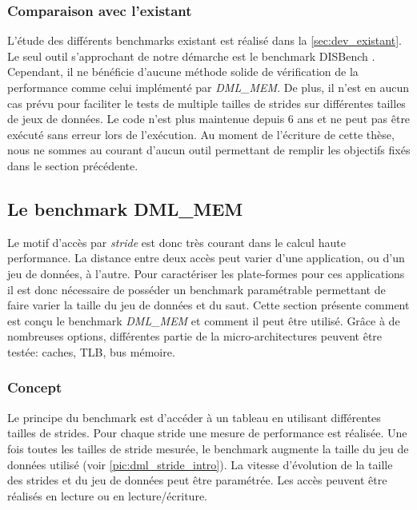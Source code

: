     
    \subsubsection{Comparaison avec l'existant}
        L'étude des différents benchmarks existant est réalisé dans la \autoref{sec:dev_existant}. Le seul outil s'approchant de notre démarche est le benchmark DISBench \cite{disbench}. Cependant, il ne bénéficie d'aucune méthode solide de vérification de la performance comme celui implémenté par \textit{DML\_MEM}. De plus, il n'est en aucun cas prévu pour faciliter le tests de multiple tailles de strides sur différentes tailles de jeux de données. Le code n'est plus maintenue depuis 6 ans et ne peut pas être exécuté sans erreur lors de l'exécution. Au moment de l'écriture de cette thèse, nous ne sommes au courant d'aucun outil permettant de remplir les objectifs fixés dans le section précédente. 


\subsection{Le benchmark DML\_MEM}
    Le motif d'accès par \textit{stride} est donc très courant dans le calcul haute performance. La distance entre deux accès peut varier d'une application, ou d'un jeu de données, à l'autre. Pour caractériser les plate-formes pour ces applications il est donc nécessaire de posséder un benchmark paramétrable permettant de faire varier la taille du jeu de données et du saut. Cette section présente comment est conçu le benchmark \textit{DML\_MEM} et comment il peut être utilisé. Grâce à de nombreuses options, différentes partie de la micro-architectures peuvent être testée: caches, TLB, bus mémoire.


    \subsubsection{Concept}
        
        Le principe du benchmark est d'accéder à un tableau en utilisant différentes tailles de strides. Pour chaque stride une mesure de performance est réalisée. Une fois toutes les tailles de stride mesurée, le benchmark augmente la taille du jeu de données utilisé (voir \autoref{pic:dml_stride_intro}). La vitesse d'évolution de la taille des strides et du jeu de données peut être paramétrée. Les accès peuvent être réalisés en lecture ou en lecture/écriture.
       
